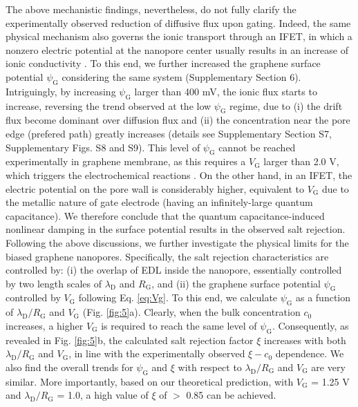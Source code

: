 \documentclass[journal=langd5,email=true, hyperref=true, keywords=false]{achemso}
\newcommand{\Fig}{Fig.}
\begin{document}
The above mechanistic findings, nevertheless, do not fully clarify the
experimentally observed reduction of diffusive flux upon
gating. Indeed, the same physical mechanism also governs the ionic
transport through an IFET, in which a nonzero electric potential at
the nanopore center usually results in an increase of ionic
conductivity \cite{Nam_2009,Lee_2015,Feng_2016}. To this end, we
further increased the graphene surface potential $\psi_{\mathrm{G}}$
considering the same system (Supplementary Section 6). Intriguingly,
by increasing $\psi_{\mathrm{G}}$ larger than 400 mV, the ionic flux
starts to increase, reversing the trend observed at the low
$\psi_{\mathrm{G}}$ regime, due to (i) the drift flux become dominant
over diffusion flux and (ii) the concentration near the pore edge
(prefered path) greatly increases (details see Supplementary Section
S7, Supplementary Figs. S8 and S9). This level of $\psi_{\mathrm{G}}$
cannot be reached experimentally in graphene membrane, as this
requires a $V_{\mathrm{G}}$ larger than 2.0 V, which triggers the
electrochemical reactions \cite{Toh_2011}. On the other hand, in an
IFET, the electric potential on the pore wall is considerably higher,
equivalent to $V_{\mathrm{G}}$ due to the metallic nature of gate
electrode (having an infinitely-large quantum capacitance). We
therefore conclude that the quantum capacitance-induced nonlinear
damping in the surface potential results in the observed salt
rejection.  Following the above discussions, we further investigate
the physical limits for the biased graphene nanopores. Specifically,
the salt rejection characteristics are controlled by: (i) the overlap
of EDL inside the nanopore, essentially controlled by two length
scales of $\lambda_{\mathrm{D}}$ and $R_{\mathrm{G}}$, and (ii) the
graphene surface potential $\psi_{\mathrm{G}}$ controlled by
$V_{\mathrm{G}}$ following Eq. \eqref{eq:Vg}. To this end, we
calculate $\psi_{\mathrm{G}}$ as a function of
$\lambda_{\mathrm{D}} / R_{\mathrm{G}}$ and $V_{\mathrm{G}}$ (\Fig{}
\ref{fig:5}a). Clearly, when the bulk concentration $c_{0}$ increases,
a higher $V_{\mathrm{G}}$ is required to reach the same level of
$\psi_{\mathrm{G}}$. Consequently, as revealed in \Fig{} \ref{fig:5}b,
the calculated salt rejection factor $\xi$ increases with both
$\lambda_{\mathrm{D}} / R_{\mathrm{G}}$ and $V_{\mathrm{G}}$, in line
with the experimentally observed $\xi - c_{0}$ dependence. We also
find the overall trends for $\psi_{\mathrm{G}}$ and $\xi$ with respect
to $\lambda_{\mathrm{D}}/R_{\mathrm{G}}$ and $V_{\mathrm{G}}$ are very
similar. More importantly, based on our theoretical prediction, with
$V_{\mathrm{G}}$ = 1.25 V and $\lambda_{\mathrm{D}} / R_{\mathrm{G}}$
= 1.0, a high value of $\xi$ of $>$ 0.85 can be achieved.
\end{document}
